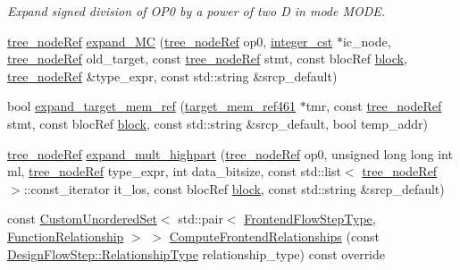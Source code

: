 \begin{DoxyCompactItemize}
\begin{DoxyCompactList}\small\item\em Expand signed division of O\+P0 by a power of two D in mode M\+O\+DE. \end{DoxyCompactList}\item 
\hyperlink{tree__node_8hpp_a6ee377554d1c4871ad66a337eaa67fd5}{tree\+\_\+node\+Ref} \hyperlink{classIR__lowering_a00b8351a51bd62d131105fc1098bd0f7}{expand\+\_\+\+MC} (\hyperlink{tree__node_8hpp_a6ee377554d1c4871ad66a337eaa67fd5}{tree\+\_\+node\+Ref} op0, \hyperlink{structinteger__cst}{integer\+\_\+cst} $\ast$ic\+\_\+node, \hyperlink{tree__node_8hpp_a6ee377554d1c4871ad66a337eaa67fd5}{tree\+\_\+node\+Ref} old\+\_\+target, const \hyperlink{tree__node_8hpp_a6ee377554d1c4871ad66a337eaa67fd5}{tree\+\_\+node\+Ref} stmt, const bloc\+Ref \hyperlink{structblock}{block}, \hyperlink{tree__node_8hpp_a6ee377554d1c4871ad66a337eaa67fd5}{tree\+\_\+node\+Ref} \&type\+\_\+expr, const std\+::string \&srcp\+\_\+default)
\item 
bool \hyperlink{classIR__lowering_a374c0d4f54d89c8937343259e202e1b1}{expand\+\_\+target\+\_\+mem\+\_\+ref} (\hyperlink{structtarget__mem__ref461}{target\+\_\+mem\+\_\+ref461} $\ast$tmr, const \hyperlink{tree__node_8hpp_a6ee377554d1c4871ad66a337eaa67fd5}{tree\+\_\+node\+Ref} stmt, const bloc\+Ref \hyperlink{structblock}{block}, const std\+::string \&srcp\+\_\+default, bool temp\+\_\+addr)
\item 
\hyperlink{tree__node_8hpp_a6ee377554d1c4871ad66a337eaa67fd5}{tree\+\_\+node\+Ref} \hyperlink{classIR__lowering_a7c9d4a3404e6c21b09acb961d905ae53}{expand\+\_\+mult\+\_\+highpart} (\hyperlink{tree__node_8hpp_a6ee377554d1c4871ad66a337eaa67fd5}{tree\+\_\+node\+Ref} op0, unsigned long long int ml, \hyperlink{tree__node_8hpp_a6ee377554d1c4871ad66a337eaa67fd5}{tree\+\_\+node\+Ref} type\+\_\+expr, int data\+\_\+bitsize, const std\+::list$<$ \hyperlink{tree__node_8hpp_a6ee377554d1c4871ad66a337eaa67fd5}{tree\+\_\+node\+Ref} $>$\+::const\+\_\+iterator it\+\_\+los, const bloc\+Ref \hyperlink{structblock}{block}, const std\+::string \&srcp\+\_\+default)
\item 
const \hyperlink{classCustomUnorderedSet}{Custom\+Unordered\+Set}$<$ std\+::pair$<$ \hyperlink{frontend__flow__step_8hpp_afeb3716c693d2b2e4ed3e6d04c3b63bb}{Frontend\+Flow\+Step\+Type}, \hyperlink{classFrontendFlowStep_af7cf30f2023e5b99e637dc2058289ab0}{Function\+Relationship} $>$ $>$ \hyperlink{classIR__lowering_a071c0cd6fc3ab02d7c7581426abe47a4}{Compute\+Frontend\+Relationships} (const \hyperlink{classDesignFlowStep_a723a3baf19ff2ceb77bc13e099d0b1b7}{Design\+Flow\+Step\+::\+Relationship\+Type} relationship\+\_\+type) const override

\end{DoxyCompactItemize}
